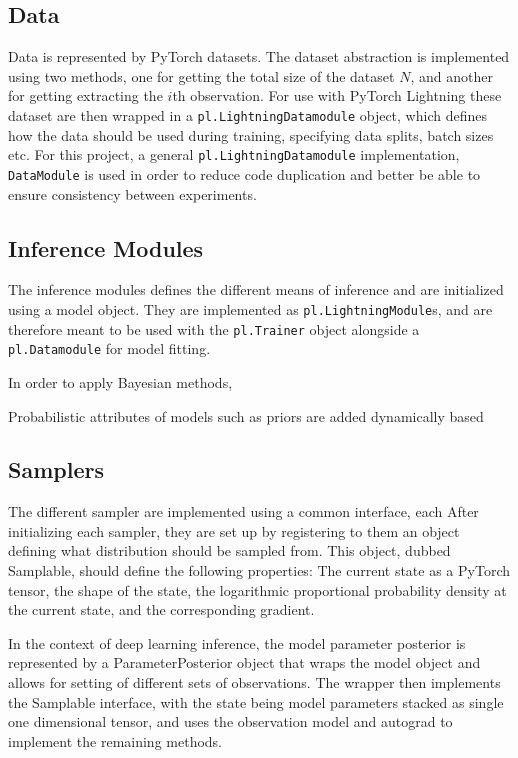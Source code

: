 \subsection{Data}
Data is represented by PyTorch datasets.
The dataset abstraction is implemented using two methods, one for getting the total size of the dataset $N$, and another for getting extracting the $i$th observation.
For use with PyTorch Lightning these dataset are then wrapped in a \texttt{pl.LightningDatamodule} object, which defines how the data should be used during training, specifying data splits, batch sizes etc.
For this project, a general \texttt{pl.LightningDatamodule} implementation, \texttt{DataModule} is used in order to reduce code duplication and better be able to ensure consistency between experiments. 

\subsection{Inference Modules}
The inference modules defines the different means of inference and are initialized using a model object.
They are implemented as \texttt{pl.LightningModule}s, and are therefore meant to be used with the \texttt{pl.Trainer} object alongside a \texttt{pl.Datamodule} for model fitting. 

In order to apply Bayesian methods, 

Probabilistic attributes of models such as priors are added dynamically based


\subsection{Samplers}
The different sampler are implemented using a common interface, each 
After initializing each sampler, they are set up by registering to them an object defining what distribution should be sampled from. 
This object, dubbed Samplable, should define the following properties: The current state as a PyTorch tensor, the shape of the state, the logarithmic proportional probability density at the current state, and the corresponding gradient.  

In the context of deep learning inference, the model parameter posterior is represented by a ParameterPosterior object that wraps the model object and allows for setting of different sets of observations.
The wrapper then implements the Samplable interface, with the state being model parameters stacked as single one dimensional tensor, and uses the observation model and autograd to implement the remaining methods.


